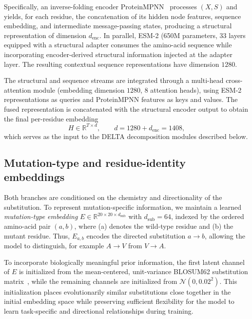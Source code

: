 \documentclass[11pt,a4paper]{article}
\theoremstyle{plain}
\theoremstyle{definition}
\begin{document}
Specifically, an inverse-folding encoder ProteinMPNN~\cite{dauparas2022robust} processes $(X,S)$ and yields, for each residue, the concatenation of its hidden node features, sequence embedding, and intermediate message-passing states, producing a structural representation of dimension $d_{\mathrm{enc}}$. In parallel, ESM-2 (650M parameters, 33 layers~\cite{lin2023evolutionary} equipped with a structural adapter consumes the amino-acid sequence while incorporating encoder-derived structural information injected at the adapter layer. The resulting contextual sequence representations have dimension $1280$.

The structural and sequence streams are integrated through a multi-head cross-attention module (embedding dimension $1280$, $8$ attention heads), using ESM-2 representations as queries and ProteinMPNN features as keys and values. The fused representation is concatenated with the structural encoder output to obtain the final per-residue embedding
\begin{equation}
H \in \mathbb{R}^{T \times d}, \qquad d = 1280 + d_{\mathrm{enc}} = 1408,
\end{equation}
which serves as the input to the DELTA decomposition modules described below.

\subsection{Mutation-type and residue-identity embeddings}
\label{sec:embeddings}

Both branches are conditioned on the chemistry and directionality of the substitution. To represent mutation-specific information, we maintain a learned \emph{mutation-type embedding} $E \in \mathbb{R}^{20 \times 20 \times d_{\mathrm{sub}}}$ with $d_{\mathrm{sub}} = 64$, indexed by the ordered amino-acid pair $(a, b)$, where (a) denotes the wild-type residue and (b) the mutant residue. Thus, $E_{a,b}$ encodes the directed substitution $a\!\rightarrow\!b$, allowing the model to distinguish, for example $A\!\rightarrow\!V$ from $V\!\rightarrow\!A$.

To incorporate biologically meaningful prior information, the first latent channel of $E$ is initialized from the mean-centered, unit-variance BLOSUM62 substitution matrix~\cite{henikoff1992amino}, while the remaining channels are initialized from $\mathcal{N}(0,0.02^2)$. This initialization places evolutionarily similar substitutions close together in the initial embedding space while preserving sufficient flexibility for the model to learn task-specific and directional relationships during training.
\end{document}
